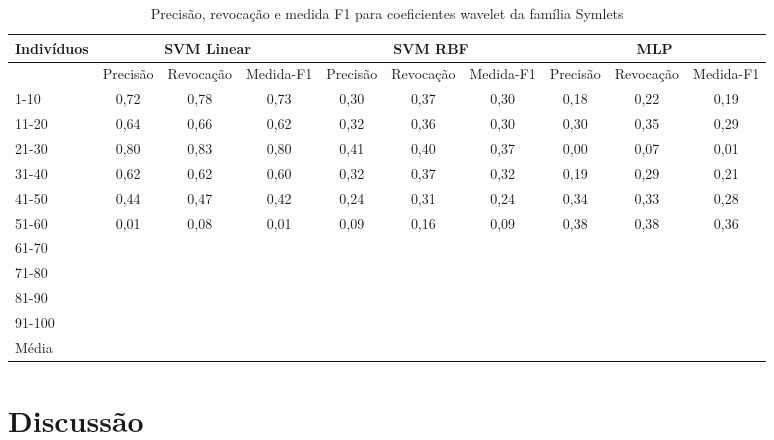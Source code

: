 \documentclass[conference]{IEEEtran}
\begin{document}
\begin{table}[!t]
\caption{Precisão, revocação e medida F1 para coeficientes wavelet da família Symlets}
\label{table_db2_metric}
\centering
\begin{tabular}{lccc|ccc|ccc} \hline
Indivíduos & \multicolumn{3}{c|}{SVM Linear} & \multicolumn{3}{c|}{SVM RBF} & \multicolumn{3}{c|}{MLP} \\ \hline
       & Precisão & Revocação & Medida-F1 & Precisão & Revocação & Medida-F1 & Precisão & Revocação & Medida-F1 \\ \hline
1-10   &   0,72   &   0,78    &   0,73    &   0,30   &   0,37    &   0,30    &   0,18   &   0,22    &   0,19    \\
11-20  &   0,64   &   0,66    &   0,62    &   0,32   &   0,36    &   0,30    &   0,30   &   0,35    &   0,29    \\
21-30  &   0,80   &   0,83    &   0,80    &   0,41   &   0,40    &   0,37    &   0,00   &   0,07    &   0,01    \\
31-40  &   0,62   &   0,62    &   0,60    &   0,32   &   0,37    &   0,32    &   0,19   &   0,29    &   0,21    \\
41-50  &   0,44   &   0,47    &   0,42    &   0,24   &   0,31    &   0,24    &   0,34   &   0,33    &   0,28    \\
51-60  &   0,01   &   0,08    &   0,01    &   0,09   &   0,16    &   0,09    &   0,38   &   0,38    &   0,36    \\
61-70  &          &           &           &          &           &           &          &           &           \\
71-80  &          &           &           &          &           &           &          &           &           \\
81-90  &          &           &           &          &           &           &          &           &           \\
91-100 &          &           &           &          &           &           &          &           &           \\ \hline
Média  &          &           &           &          &           &           &          &           &           \\
\end{tabular}
\end{table}

\newpage

\section{Discussão} \label{sec:discussao}
\end{document}
